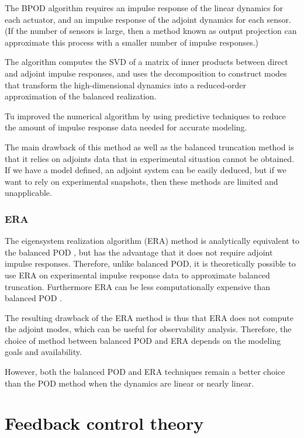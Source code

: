 \documentclass[12pt,lot, lof]{puthesis}
\begin{document}
The BPOD algorithm requires an impulse response of the linear dynamics for each actuator, and an impulse response of the adjoint dynamics for each sensor. (If the number of sensors is large, then a method known as output projection can approximate this process with a smaller number of impulse responses.) 

The algorithm computes the SVD of a matrix of inner products between direct and adjoint impulse responses, and uses the decomposition to construct modes that transform the high-dimensional dynamics into a reduced-order approximation of the balanced realization. 

Tu \cite{Tu12} improved the numerical algorithm by using predictive techniques to reduce the amount of impulse response data needed for accurate modeling.

The main drawback of this method  as well as the balanced truncation method is that it relies on adjoints data that in experimental situation cannot be obtained. If we have a model defined, an adjoint system can be easily deduced, but if we want to rely on experimental snapshots, then these methods are limited and unapplicable. 

\subsection{ERA}

The eigensystem realization algorithm (ERA) method is analytically equivalent to the balanced POD \cite{Ma11}, but has the advantage that it does not require adjoint impulse responses. Therefore, unlike balanced POD, it is theoretically possible to use ERA on experimental impulse response data to approximate balanced truncation. Furthermore ERA can be less computationally expensive than balanced POD \cite{Ma11}. 

The resulting drawback of the ERA method is thus that ERA does not compute the adjoint modes, which can be useful for observability analysis. Therefore, the choice of method between balanced POD and ERA depends on the modeling goals and availability.
 
However, both the balanced POD and ERA techniques remain a better choice than the POD method when the dynamics are linear or nearly linear.


\chapter{Feedback control theory}
\label{chapitre3}
\end{document}
